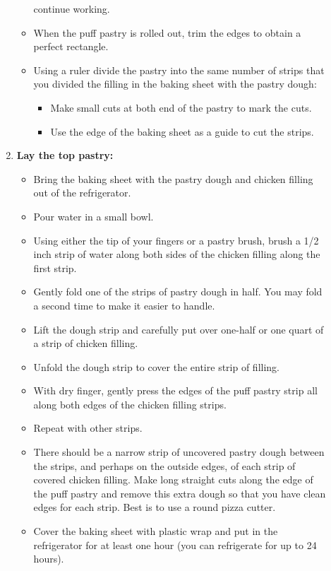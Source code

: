 \documentclass[11pt,letterpaper]{article}
\begin{document}
\begin{description}
\begin{enumerate}
\begin{itemize}
        continue working.
        \item When the puff pastry is rolled out, trim the edges to obtain a perfect rectangle.
        \item Using a ruler divide the pastry into the same number of
        strips that you divided the filling in the baking sheet with
        the pastry dough:
        \begin{itemize}
                \item Make small cuts at both end of the pastry to
                mark the cuts.
                \item Use the edge of the baking sheet as a guide to
                cut the strips.
        \end{itemize}
        \end{itemize}
\item{\bf Lay the top pastry:}    
       \begin{itemize}   
        \item Bring the baking sheet with the pastry dough and chicken
        filling out of the refrigerator.
        \item Pour water in a small bowl.
        \item Using either the tip of your fingers or a pastry brush,
        brush a 1/2 inch strip of water along both sides of the chicken filling along the first        strip.
        \item Gently fold one of the strips of pastry dough in half. You may fold a second time to make it easier to handle.
        \item Lift the dough strip and carefully put over one-half or one quart of
        a strip of chicken filling.
        \item Unfold the dough strip to cover the entire strip of filling.
        \item With dry finger, gently press the edges of the puff
        pastry strip all along both edges of the chicken filling strips.
        \item Repeat with other strips.
        \item There should be a narrow strip of uncovered pastry dough
        between the strips, and perhaps on the outside edges, of each strip of
        covered chicken filling. Make long straight cuts along the
        edge of the puff pastry and remove this extra dough so that
        you have clean edges for each strip. Best is to use a round pizza cutter.

        \item Cover the baking sheet with plastic wrap and put in the
        refrigerator for at least one hour (you can refrigerate for up
        to 24 hours).
        \end{itemize}
        


\end{enumerate}
\end{description}
\end{document}
